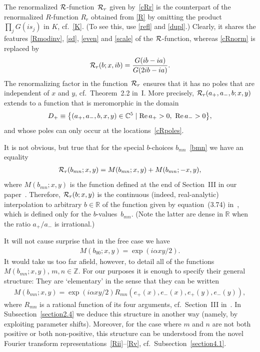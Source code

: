 \documentclass[11pt]{article}
\numberwithin{equation}{section}
\newcommand{\Z}{{\mathbb Z}}
\newcommand{\C}{{\mathbb C}}
\newcommand{\R}{{\mathbb R}}
\newcommand{\re}{{\rm Re}\, }
\newcommand{\cR}{{\cal R}}
\newcommand{\aaa}{a_{+},a_{-}}
\begin{document}
The renormalized $\cR$-function~$\cR_r$ given by~\eqref{cRr}
is the counterpart of the renormalized $R$-function $R_r$ obtained from \eqref{R} by omitting the product $\prod_jG(is_j)$ in $K$, cf.~\eqref{K}. (To see this, use \eqref{refl} and \eqref{dupl}.) Clearly, it shares the features \eqref{Rmodinv}, \eqref{sd}, \eqref{even} and \eqref{scale} of the $\cR$-function, whereas \eqref{cRnorm} is replaced by
\begin{gather}\label{cRrnorm}
\cR_r(b;x,ib)=\frac{G(ib-ia)}{G(2ib-ia)}.
\end{gather}
The renormalizing factor in the function~$\cR_r$ ensures that it has no poles that are independent of $x$ and $y$, cf.~Theorem~2.2 in~I. More precisely, $\cR_r(\aaa,b;x,y)$ extends to a function that is meromorphic in the domain{\samepage
\begin{gather}\label{Dp}
D_+\equiv \big\{ (\aaa,b,x,y)\in \C^5 \mid \re a_+>0,\ \re a_->0\big\},
\end{gather}
and whose poles can only occur at the locations~\eqref{cRpoles}.}

It is not obvious, but true that for the special $b$-choices $b_{mn}$~\eqref{bmn}
we have an equality
\begin{gather}\label{cRM}
\cR_r(b_{mn};x,y)=M(b_{mn};x,y)+M(b_{mn};-x,y),
\end{gather}
where $M(b_{mn};x,y)$ is the function def\/ined at the end of Section~III in our paper~\cite{GLFII}. Therefore, $\cR_r(b;x,y)$ is the continuous (indeed, real-analytic) interpolation to arbitrary $b\in\R$ of  the function given by equation~(3.74) in~\cite{GLFII}, which is def\/ined only for the $b$-values~$b_{mn}$. (Note the latter are dense in $\R$ when the ratio $a_{+}/a_{-}$ is irrational.)

It will not cause surprise that in the free case we have
\begin{gather}\label{M00}
M(b_{00};x,y)=\exp(i\alpha xy/2).
\end{gather}
It would take us too far af\/ield, however, to detail all of the functions $M(b_{mn};x,y)$, $m,n\in\Z$. For our purposes it is enough to specify their general structure: They are `elementary' in the sense that they can be written
\begin{gather}\label{Mform}
M(b_{mn};x,y)=\exp(i\alpha xy/2)R_{mn}(e_{+}(x),e_{-}(x),e_{+}(y),e_{-}(y)),
\end{gather}
where $R_{mn}$ is a rational function of its four arguments, cf.~Section~III in~\cite{GLFII}. In Subsection~\ref{section2.4} we deduce this structure in another way (namely, by exploiting parameter shifts). Moreover, for the case where $m$ and $n$ are not both positive or both non-positive, this structure can be understood from the novel Fourier transform representations~\eqref{Rii}--\eqref{Rv}, cf.~Subsection~\ref{section4.1}.
\end{document}
